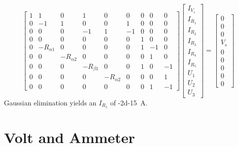 \documentclass[]{article}
\begin{document}
\begin{equation}
	\begin{bmatrix}
	1 & 1 & 0 & 1 & 0 & 0 & 0 & 0 & 0 \\
	0 & -1 & 1 & 0 & 0 & 1 & 0 & 0 & 0 \\
	0 & 0 & 0 & -1 & 1 & -1 & 0 & 0 & 0 \\
	0 & 0 & 0 & 0 & 0 & 0 & 1 & 0 & 0 \\
	0 & -R_{\alpha 1} & 0 & 0 & 0 & 0 & 1 & -1 & 0 \\
	0 & 0 & -R_{\alpha 2} & 0 & 0 & 0 & 0 & 1 & 0  \\
	0 & 0 & 0 & -R_{\beta 1} & 0 & 0 & 1 & 0 & -1 \\
	0 & 0 & 0 & 0 & -R_{\alpha 2} & 0 & 0 & 0 & 1 \\
	0 & 0 & 0 & 0 & 0 & 0 & 0 & 1 & -1
	\end{bmatrix}
	\begin{bmatrix}
	I_{V_s} \\
	I_{R_1} \\
	I_{R_2} \\
	I_{R_3} \\
	I_{R_4} \\
	I_{R_5} \\
	U_1 \\
	U_2 \\
	U_3
	\end{bmatrix}
	=
	\begin{bmatrix}
	0 \\
	0 \\
	0 \\
	V_s \\
	0 \\
	0 \\
	0 \\
	0 \\
	0
	\end{bmatrix}
\end{equation}
Gaussian elimination yields an \(I_{R_5}\) of \SI{-2d-15}{\ampere}. 

\section{Volt and Ammeter}

\subsection{}
\end{document}
